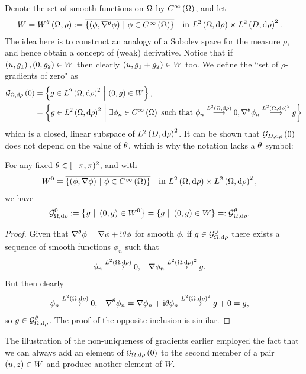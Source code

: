 Denote the set of smooth functions on $\Omega$ by $C^{\infty}\left( \Omega \right)$, and let
\begin{align*} %
	W = W^{\qm}\bracs{\ddom,\rho} &:= \overline{\clbracs{\bracs{\phi,\tgrad\phi} \setVert \phi\in\smooth{\ddom}}} \quad \text{in} \ \ltwo{\ddom}{\rho}\times\ltwo{D}{\rho}^2.
\end{align*}
The idea here is to construct an analogy of a Sobolev space for the measure $\rho$, and hence obtain a concept of (weak) derivative.
Notice that if $\left( u,g_1 \right),\left( 0,g_2 \right)\in W$ then clearly $\left( u, g_1+g_2 \right)\in W$ too.
We define the ``set of $\rho$-gradients of zero" as
\begin{align} \label{eq:GradZeroDef}
	\mathcal{G}_{ \Omega, \mathrm{d}\rho}\left( 0 \right) &= \left\{  g\in L^{2}\left( \Omega,\mathrm{d}\rho \right)^2 \ \middle\vert \  \left( 0,g \right)\in W \right\}, \\
	&= \left\{  g\in L^{2}\left( \Omega,\mathrm{d}\rho \right)^2 \ \middle\vert \  \exists\phi_n\in C^{\infty}\left( \Omega \right) \text{ such that } \phi_n\overset{L^{2}\left( \Omega,\mathrm{d}\rho \right)}{\longrightarrow} 0, \nabla^{\theta}\phi_n\overset{L^{2}\left( \Omega,\mathrm{d}\rho \right)^2}{\longrightarrow} g  \right\}
\end{align}
which is a closed, linear subspace of $L^{2}\left( D,\mathrm{d}\rho \right)^2$. 
It can be shown that $\mathcal{G}_{ D, \mathrm{d}\rho}\left( 0 \right)$ does not depend on the value of $\theta$, which is why the notation lacks a $\theta$ symbol:
\begin{prop} \label{prop:GradZeroInvarientUnderQM}
	For any fixed $\theta\in[-\pi,\pi)^2$, and with
	\begin{align*}
		W^0 &= \overline{\left\{ \left( \phi,\nabla\phi \right) \ \middle\vert \  \phi\in C^{\infty}\left( \Omega \right) \right\}} \quad \mathrm{in} \ L^{2}\left( \Omega,\mathrm{d}\rho \right)\times L^{2}\left( \Omega,\mathrm{d}\rho \right)^2,
	\end{align*}	
	we have
	\begin{align*}
		\mathcal{G}^0_{\Omega, \mathrm{d} \rho} := \left\{  g \ \vert \ \left( 0,g \right)\in W^0 \right\} &= 
		\left\{  g \ \vert \ \left( 0,g \right)\in W \right\} =: \mathcal{G}^{\theta}_{\Omega, \mathrm{d} \rho}.
	\end{align*}
\end{prop}
\begin{proof}
	Given that $\nabla^{\theta}\phi = \nabla\phi + \mathrm{i}\theta\phi$ for smooth $\phi$, if $g\in\mathcal{G}^0_{\Omega, \mathrm{d} \rho}$ there exists a sequence of smooth functions $\phi_n$ such that 
	\begin{align*}
		\phi_n\overset{L^{2}\left( \Omega,\mathrm{d}\rho \right)}{\longrightarrow}0, &\quad \nabla\phi_n\overset{L^{2}\left( \Omega,\mathrm{d}\rho \right)^2}{\longrightarrow}g.
	\end{align*}
	But then clearly
	\begin{align*}
		\phi_n\overset{L^{2}\left( \Omega,\mathrm{d}\rho \right)}{\longrightarrow}0, &\quad
		\nabla^{\theta}\phi_n = \nabla\phi_n + \mathrm{i}\theta\phi_n \overset{L^{2}\left( \Omega,\mathrm{d}\rho \right)^2}{\longrightarrow} g + 0 = g,
	\end{align*}
	so $g\in\mathcal{G}^\theta_{\Omega, \mathrm{d} \rho}$.
	The proof of the opposite inclusion is similar.
\end{proof}
The illustration of the non-uniqueness of gradients earlier employed the fact that we can always add an element of $\mathcal{G}_{ \Omega, \mathrm{d}\rho}\left( 0 \right)$ to the second member of a pair $\left( u,z \right)\in W$ and produce another element of $W$.

